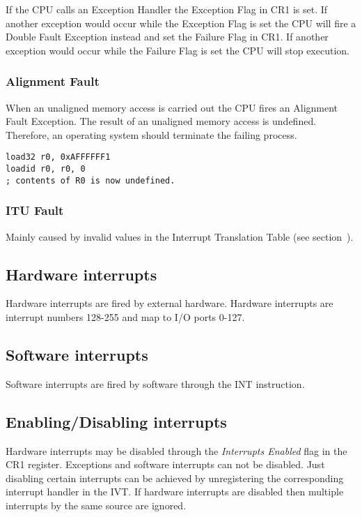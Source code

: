 If the CPU calls an Exception Handler the Exception Flag in CR1 is set. If another exception would occur while the Exception Flag is set the CPU
will fire a Double Fault Exception instead and set the Failure Flag in CR1. If another exception would occur while the Failure Flag is set the CPU
will stop execution. 

\subsubsection{Alignment Fault}

When an unaligned memory access is carried out the CPU fires an Alignment Fault Exception. The result of an unaligned memory access is undefined. Therefore,
an operating system should terminate the failing process. 

\begin{verbatim}
load32 r0, 0xAFFFFFF1
loadid r0, r0, 0
; contents of R0 is now undefined.
\end{verbatim}

\subsubsection{ITU Fault}

Mainly caused by invalid values in the Interrupt Translation Table (see section~).

\subsection{Hardware interrupts}

Hardware interrupts are fired by external hardware. Hardware interrupts are interrupt numbers 128-255 and map to
I/O ports 0-127. 

\subsection{Software interrupts}

Software interrupts are fired by software through the INT instruction. 

\subsection{Enabling/Disabling interrupts}

Hardware interrupts may be disabled through the \emph{Interrupts Enabled} flag in the CR1 register.
Exceptions and software interrupts can not be disabled. Just disabling certain interrupts can be achieved by unregistering the corresponding
interrupt handler in the \Gls{IVT}. If hardware interrupts are disabled then multiple interrupts by the same source are ignored. 

